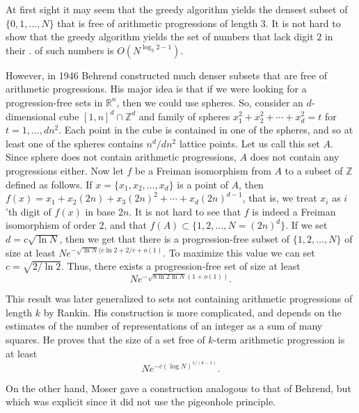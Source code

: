 \documentclass[12pt]{article}
\begin{document}

At first sight it may seem that the greedy algorithm yields the densest subset of $\{0,1,\dotsc,N\}$ that is free of arithmetic progressions of length $3$. It is not hard to show that the greedy algorithm yields the set of numbers that lack digit $2$ in their .  of such numbers is $O(N^{\log_3 2-1})$.

However, in 1946 Behrend\cite{cite:behrend_szem_low} constructed much denser subsets that are free of arithmetic progressions. His major idea is that if we were looking for a progression-free sets in $\mathbb{R}^n$, then we could use spheres. So, consider an $d$-dimensional cube $[1,n]^d \cap \mathbb{Z}^d$ and family of spheres $x_1^2+x_2^2+\dotsb+x_d^2=t$ for $t=1, \dotsc, d n^2$. Each point in the cube is contained in one of the spheres, and so at least one of the spheres contains $n^d/d n^2$ lattice points. Let us call this set $A$. Since sphere does not contain arithmetic progressions, $A$ does not contain any progressions either. Now let $f$ be a Freiman isomorphism from $A$ to a subset of $\mathbb{Z}$ defined as follows. If $x=\{x_1,x_2,\dotsc,x_d\}$ is a point of $A$, then $f(x)=x_1+x_2(2n)+x_3(2n)^2+\dotsb+x_d(2n)^{d-1}$, that is, we treat $x_i$ as $i$'th digit of $f(x)$ in base $2n$. It is not hard to see that $f$ is indeed a Freiman isomorphism of order $2$, and that $f(A) \subset \{1, 2,\dotsc,N=(2n)^d\}$. If we set $d=c\sqrt{\ln N}$, then we get that there is a progression-free subset of $\{1,2,\dotsc,N\}$ of size at least
$N e^{-\sqrt{\ln N}(c\ln 2+2/c+o(1)}$. To maximize this value we can set $c=\sqrt{2/\ln 2}$. Thus, there exists a progression-free set of size at least
\begin{equation*}
N e^{-\sqrt{8\ln 2 \ln N}(1+o(1))}.
\end{equation*}

This result was later generalized to sets not containing arithmetic progressions of length $k$ by Rankin\cite{cite:rankin_behrgen}. His construction is more complicated, and depends on the estimates of the number of representations of an integer as a sum of many squares. He proves that the size of a set free of $k$-term arithmetic progression is at least
\begin{equation*}
N e^{-c (\log N)^{1/(k-1)}}.
\end{equation*}

On the other hand, Moser\cite{cite:moser_behrendbound} gave a
construction analogous to that of Behrend, but which was explicit
since it did not use the pigeonhole principle.
\end{document}
